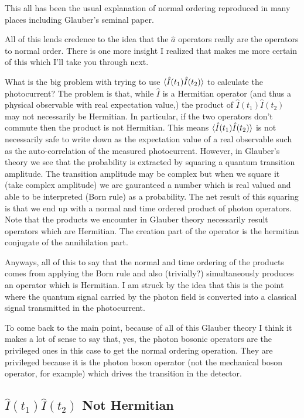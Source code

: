\documentclass[12pt]{article}
\newcommand{\ahat}{\hat{a}}
\begin{document}
This all has been the usual explanation of normal ordering reproduced in many places including Glauber's seminal paper.

All of this lends credence to the idea that the $\ahat$ operators really are the operators to normal order. There is one more insight I realized that makes me more certain of this which I'll take you through next. 

What is the big problem with trying to use $\braket{\hat{I}(t_1)\hat{I}(t_2)}$ to calculate the photocurrent? The problem is that, while $\hat{I}$ is a Hermitian operator (and thus a physical observable with real expectation value,) the product of $\hat{I}(t_1)\hat{I}(t_2)$ may not necessarily be Hermitian. In particular, if the two operators don't commute then the product is not Hermitian. This means $\braket{\hat{I}(t_1)\hat{I}(t_2)}$ is not necessarily safe to write down as the expectation value of a real observable such as the auto-correlation of the measured photocurrent. 
However, in Glauber's theory we see that the probability is extracted by squaring a quantum transition amplitude. The transition amplitude may be complex but when we square it (take complex amplitude) we are gauranteed a number which is real valued and able to be interpreted (Born rule) as a probability. The net result of this squaring is that we end up with a normal and time ordered product of photon operators. Note that the products we encounter in Glauber theory necessarily result operators which are Hermitian. The creation part of the operator is the hermitian conjugate of the annihilation part.

Anyways, all of this to say that the normal and time ordering of the products comes from applying the Born rule and also (trivially?) simultaneously produces an operator which is Hermitian. I am struck by the idea that this is the point where the quantum signal carried by the photon field is converted into a classical signal transmitted in the photocurrent.

To come back to the main point, because of all of this Glauber theory I think it makes a lot of sense to say that, yes, the photon bosonic operators are the privileged ones in this case to get the normal ordering operation. They are privileged because it is the photon boson operator (not the mechanical boson operator, for example) which drives the transition in the detector.

\subsection{$\hat{I}(t_1)\hat{I}(t_2)$ Not Hermitian}
\end{document}
